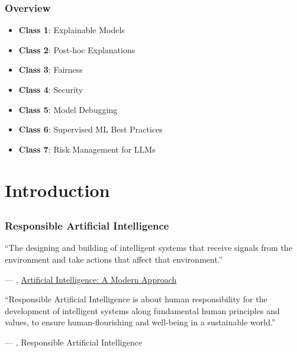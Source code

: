 \documentclass[11pt,aspectratio=169,hyperref={colorlinks}]{beamer}
\begin{document}
	
	\begin{frame}
	
		\frametitle{Overview}
		
		\begin{itemize}
			\item{\textbf{Class 1}: Explainable Models}
			\item{\textbf{Class 2}: Post-hoc Explanations}
			\item{\textbf{Class 3}: Fairness}
			\item{\textbf{Class 4}: Security}
			\item{\textbf{Class 5}: Model Debugging}
			\item{\textbf{Class 6}: Supervised ML Best Practices}
			\item{\textbf{Class 7}: Risk Management for LLMs }
			
		\end{itemize}
			
					
	\end{frame}

	\section{Introduction}
		\subsection*{} %
	
		\begin{frame}
	
			\frametitle{Responsible Artificial Intelligence}
	
			\epigraph{``The designing and building of intelligent systems that receive signals from the environment and take actions that affect that environment.''}{--- \citet{russell2010artificial}, \href{https://aima.cs.berkeley.edu/}{Artificial Intelligence: A Modern Approach}}

			\epigraph{``Responsible Artificial Intelligence is about human responsibility for the development of intelligent systems along fundamental human principles and values, to ensure human-flourishing and well-being in a sustainable world.''}{--- \citet{dignum2019responsible}, Responsible Artificial Intelligence} 
	
		\end{frame}		
\end{document}
